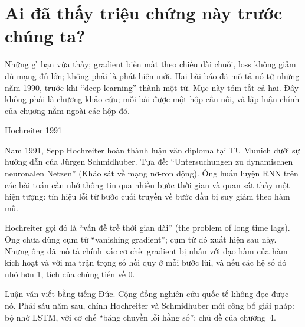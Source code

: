 %

\section{Ai đã thấy triệu chứng này trước chúng ta?}
\label{sec:ch02-cau-noi}

Những gì bạn vừa thấy; gradient biến mất theo chiều dài chuỗi, loss không
giảm dù mạng đủ lớn; không phải là phát hiện mới. Hai bài báo đã mô tả nó
từ những năm 1990, trước khi ``deep learning'' thành một từ. Mục này tóm tắt
cả hai. Đây không phải là chương khảo cứu; mỗi bài được một hộp cầu nối, và
lập luận chính của chương nằm ngoài các hộp đó.

\begin{bridge}{Hochreiter 1991}
%
%

Năm 1991, Sepp Hochreiter hoàn thành luận văn diploma tại TU Munich dưới sự
hướng dẫn của Jürgen Schmidhuber. Tựa đề: \enquote{Untersuchungen zu
dynamischen neuronalen Netzen} (Khảo sát về mạng nơ-ron động). Ông huấn luyện
RNN trên các bài toán cần nhớ thông tin qua nhiều bước thời gian và quan sát
thấy một hiện tượng: tín hiệu lỗi từ bước cuối truyền về bước đầu bị suy
giảm theo hàm mũ.

Hochreiter gọi đó là \enquote{vấn đề trễ thời gian dài} (the problem of long
time lags). Ông chưa dùng cụm từ \enquote{vanishing gradient}; cụm từ đó
xuất hiện sau này. Nhưng ông đã mô tả chính xác cơ chế: gradient bị nhân với
đạo hàm của hàm kích hoạt và với ma trận trọng số hồi quy ở mỗi bước lùi,
và nếu các hệ số đó nhỏ hơn 1, tích của chúng tiến về 0.

Luận văn viết bằng tiếng Đức. Cộng đồng nghiên cứu quốc tế không đọc được nó.
Phải sáu năm sau, chính Hochreiter và Schmidhuber mới công bố giải pháp: bộ
nhớ LSTM, với cơ chế \enquote{băng chuyền lỗi hằng số}; chủ đề của chương~4.

%
%
\end{bridge}


